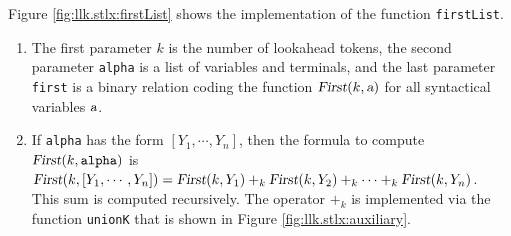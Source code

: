 Figure \ref{fig:llk.stlx:firstList} shows the implementation of the function \texttt{firstList}.
\begin{enumerate}
\item The first parameter $k$ is the number of lookahead tokens, the second parameter \texttt{alpha}
      is a list of variables and terminals, and the last parameter \texttt{first} is a binary
      relation coding the function $\textsl{First}(k, \textsl{a})$ for all syntactical variables $\textsl{a}$.
\item If \texttt{alpha} has the form $[Y_1, \cdots, Y_n]$, then the formula to compute
      $\textsl{First}(k,\mathtt{alpha})$ is
      \\[0.2cm]
      \hspace*{1.3cm}
      $\textsl{First}(k,[Y_1, \cdots, Y_n]) =  \textsl{First}(k, Y_1) +_k \textsl{First}(k, Y_2) +_k \cdots +_k \textsl{First}(k, Y_n)$.
      \\[0.2cm]
      This sum is computed recursively.  The operator $+_k$ is implemented via the function
      \texttt{unionK} that is shown in Figure \ref{fig:llk.stlx:auxiliary}.
\end{enumerate}
\pagebreak

